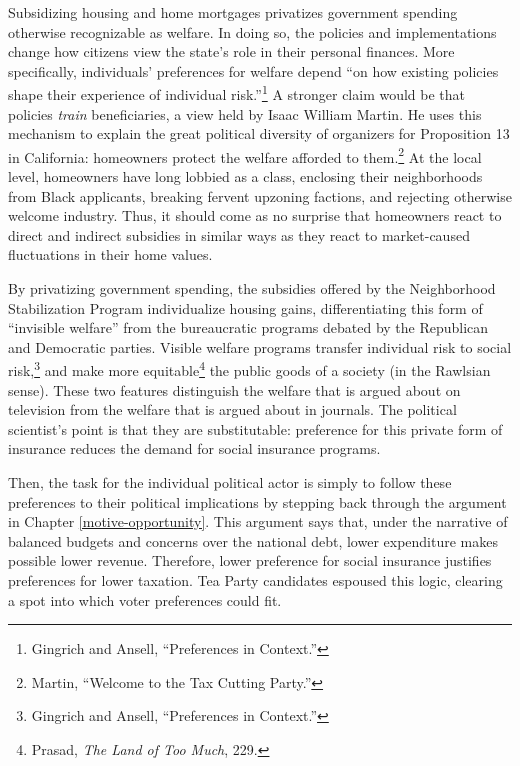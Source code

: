 \documentclass[
]{article}
\begin{document}
Subsidizing housing and home mortgages privatizes government spending otherwise recognizable as welfare.
In doing so, the policies and implementations change how citizens view the state's role in their personal finances.
More specifically, individuals' preferences for welfare depend ``on how existing policies shape their experience of individual risk.''\footnote{Gingrich and Ansell, ``Preferences in Context.''}
A stronger claim would be that policies \emph{train} beneficiaries, a view held by Isaac William Martin.
He uses this mechanism to explain the great political diversity of organizers for Proposition 13 in California: homeowners protect the welfare afforded to them.\footnote{Martin, ``Welcome to the Tax Cutting Party.''}
At the local level, homeowners have long lobbied as a class, enclosing their neighborhoods from Black applicants, breaking fervent upzoning factions, and rejecting otherwise welcome industry.
Thus, it should come as no surprise that homeowners react to direct and indirect subsidies in similar ways as they react to market-caused fluctuations in their home values.

By privatizing government spending, the subsidies offered by the Neighborhood Stabilization Program individualize housing gains, differentiating this form of ``invisible welfare'' from the bureaucratic programs debated by the Republican and Democratic parties.
Visible welfare programs transfer individual risk to social risk,\footnote{Gingrich and Ansell, ``Preferences in Context.''} and make more equitable\footnote{Prasad, \emph{The Land of Too Much}, 229.} the public goods of a society (in the Rawlsian sense).
These two features distinguish the welfare that is argued about on television from the welfare that is argued about in journals.
The political scientist's point is that they are substitutable: preference for this private form of insurance reduces the demand for social insurance programs.

Then, the task for the individual political actor is simply to follow these preferences to their political implications by stepping back through the argument in Chapter \ref{motive-opportunity}.
This argument says that, under the narrative of balanced budgets and concerns over the national debt, lower expenditure makes possible lower revenue.
Therefore, lower preference for social insurance justifies preferences for lower taxation.
Tea Party candidates espoused this logic, clearing a spot into which voter preferences could fit.
\end{document}
